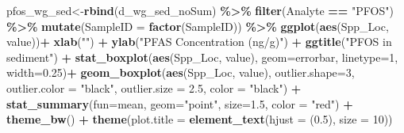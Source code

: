 \documentclass[
]{article}
\newenvironment{Shaded}{\begin{snugshade}}{\end{snugshade}}
\newcommand{\AttributeTok}[1]{\textcolor[rgb]{0.13,0.29,0.53}{#1}}
\newcommand{\DecValTok}[1]{\textcolor[rgb]{0.00,0.00,0.81}{#1}}
\newcommand{\FloatTok}[1]{\textcolor[rgb]{0.00,0.00,0.81}{#1}}
\newcommand{\FunctionTok}[1]{\textcolor[rgb]{0.13,0.29,0.53}{\textbf{#1}}}
\newcommand{\NormalTok}[1]{#1}
\newcommand{\OtherTok}[1]{\textcolor[rgb]{0.56,0.35,0.01}{#1}}
\newcommand{\SpecialCharTok}[1]{\textcolor[rgb]{0.81,0.36,0.00}{\textbf{#1}}}
\newcommand{\StringTok}[1]{\textcolor[rgb]{0.31,0.60,0.02}{#1}}
\begin{document}
\begin{Shaded}
\begin{Highlighting}[]
\NormalTok{pfos\_wg\_sed}\OtherTok{\textless{}{-}}\FunctionTok{rbind}\NormalTok{(d\_wg\_sed\_noSum) }\SpecialCharTok{\%\textgreater{}\%} 
  \FunctionTok{filter}\NormalTok{(Analyte }\SpecialCharTok{==} \StringTok{"PFOS"}\NormalTok{) }\SpecialCharTok{\%\textgreater{}\%} 
  \FunctionTok{mutate}\NormalTok{(}\AttributeTok{SampleID =} \FunctionTok{factor}\NormalTok{(SampleID)) }\SpecialCharTok{\%\textgreater{}\%} 
  \FunctionTok{ggplot}\NormalTok{(}\FunctionTok{aes}\NormalTok{(Spp\_Loc, value))}\SpecialCharTok{+}
    \FunctionTok{xlab}\NormalTok{(}\StringTok{""}\NormalTok{) }\SpecialCharTok{+}
    \FunctionTok{ylab}\NormalTok{(}\StringTok{"PFAS Concentration (ng/g)"}\NormalTok{) }\SpecialCharTok{+}
    \FunctionTok{ggtitle}\NormalTok{(}\StringTok{"PFOS in sediment"}\NormalTok{) }\SpecialCharTok{+}
    \FunctionTok{stat\_boxplot}\NormalTok{(}\FunctionTok{aes}\NormalTok{(Spp\_Loc, value),}
                 \AttributeTok{geom=}\StringTok{\textquotesingle{}errorbar\textquotesingle{}}\NormalTok{, }\AttributeTok{linetype=}\DecValTok{1}\NormalTok{, }\AttributeTok{width=}\FloatTok{0.25}\NormalTok{)}\SpecialCharTok{+}
    \FunctionTok{geom\_boxplot}\NormalTok{(}\FunctionTok{aes}\NormalTok{(Spp\_Loc, value),}
                 \AttributeTok{outlier.shape=}\DecValTok{3}\NormalTok{,}
                 \AttributeTok{outlier.color =} \StringTok{"black"}\NormalTok{,}
                 \AttributeTok{outlier.size =} \FloatTok{2.5}\NormalTok{,}
                 \AttributeTok{color =} \StringTok{"black"}\NormalTok{) }\SpecialCharTok{+} 
    \FunctionTok{stat\_summary}\NormalTok{(}\AttributeTok{fun=}\NormalTok{mean, }\AttributeTok{geom=}\StringTok{"point"}\NormalTok{, }\AttributeTok{size=}\FloatTok{1.5}\NormalTok{, }\AttributeTok{color =} \StringTok{"red"}\NormalTok{) }\SpecialCharTok{+}
    \FunctionTok{theme\_bw}\NormalTok{() }\SpecialCharTok{+}
    \FunctionTok{theme}\NormalTok{(}\AttributeTok{plot.title =} \FunctionTok{element\_text}\NormalTok{(}\AttributeTok{hjust =}\NormalTok{ (}\FloatTok{0.5}\NormalTok{), }\AttributeTok{size =} \DecValTok{10}\NormalTok{))}


\end{Highlighting}
\end{Shaded}
\end{document}
